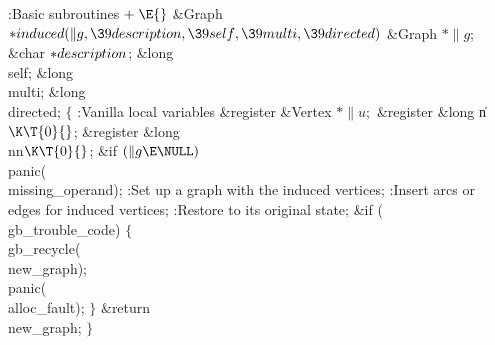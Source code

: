 \B{}:Basic subroutines\X${}\mathrel+\E{}$\6
\&{Graph} ${}{*}\\{induced}(\|g,\39\\{description},\39\\{self},\39\\{multi},\39%
\\{directed}){}$\1\1\6
\&{Graph} ${}{*}\|g{}$;\6
\&{char} ${}{*}\\{description}{}$;\6
\&{long} \\{self};\6
\&{long} \\{multi};\6
\&{long} \\{directed};\2\2\6
${}\{{}$\5
\1:Vanilla local variables\X\5
\hbox{}\6{}\&{register} \&{Vertex} ${}{*}\|u;{}$\6
\&{register} \&{long} \|n${}\K\T{0}{}$;\6
\&{register} \&{long} \\{nn}${}\K\T{0}{}$;\7
\&{if} ${}(\|g\E\NULL){}$\1\5
\\{panic}(\\{missing\_operand});\2\6
:Set up a graph with the induced vertices\X;\6
:Insert arcs or edges for induced vertices\X;\6
:Restore  to its original state\X;\6
\&{if} (\\{gb\_trouble\_code})\5
${}\{{}$\1\6
\\{gb\_recycle}(\\{new\_graph});\6
\\{panic}(\\{alloc\_fault});\6
\4${}\}{}$\2\6
\&{return} \\{new\_graph};\6
\4${}\}{}$\2\par
\fi


